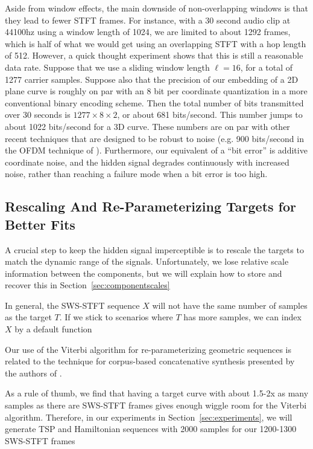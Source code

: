 \documentclass[runningheads]{llncs}
\begin{document}
Aside from window effects, the main downside of non-overlapping windows is that they lead to fewer STFT frames.  For instance, with a 30 second audio clip at 44100hz using a window length of 1024, we are limited to about 1292 frames, which is half of what we would get using an overlapping STFT with a hop length of 512.  However, a quick thought experiment shows that this is still a reasonable data rate.  Suppose that we use a sliding window length $\ell=16$, for a total of 1277 carrier samples.  Suppose also that the precision of our embedding of a 2D plane curve is roughly on par with an 8 bit per coordinate quantization in a more conventional binary encoding scheme.  Then the total number of bits transmitted over 30 seconds is $1277 \times 8 \times 2$, or about 681 bits/second.  This number jumps to about 1022 bits/second for a 3D curve.  These numbers are on par with other recent techniques that are designed to be robust to noise (e.g. 900 bits/second in the OFDM technique of \cite{eichelberger_receiving_2019}).  Furthermore, our equivalent of a ``bit error'' is additive coordinate noise, and the hidden signal degrades continuously with increased noise, rather than reaching a failure mode when a bit error is too high.




\subsection{Rescaling And Re-Parameterizing Targets for Better Fits}
\label{sec:reparam}


A crucial step to keep the hidden signal imperceptible is to rescale the targets to match the dynamic range of the signals.  Unfortunately, we lose relative scale information between the components, but we will explain how to store and recover this in Section~\ref{sec:componentscales}


In general, the SWS-STFT sequence $X$ will not have the same number of samples as the target $T$.  If we stick to scenarios where $T$ has more samples, we can index $X$ by a default function 



Our use of the Viterbi algorithm for re-parameterizing geometric sequences is related to the technique for corpus-based concatenative synthesis presented by the authors of \cite{schwarz2007corpus}.


As a rule of thumb, we find that having a target curve with about 1.5-2x as many samples as there are SWS-STFT frames gives enough wiggle room for the Viterbi algorithm.  Therefore, in our experiments in Section~\ref{sec:experiments}, we will generate TSP and Hamiltonian sequences with 2000 samples for our 1200-1300 SWS-STFT frames
\end{document}
